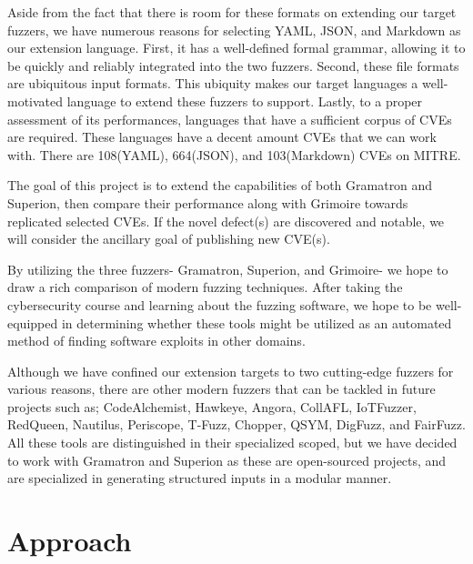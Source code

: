 \documentclass[12pt]{diazessay}
\begin{document}
Aside from the fact that there is room for these formats on extending our target fuzzers, we have numerous reasons for selecting YAML, JSON, and Markdown as our extension language.
First, it has a well-defined formal grammar, allowing it to be quickly and reliably integrated into the two fuzzers.
Second, these file formats are ubiquitous input formats.
This ubiquity makes our target languages a well-motivated language to extend these fuzzers to support.
Lastly, to a proper assessment of its performances, languages that have a sufficient corpus of CVEs are required. 
These languages have a decent amount CVEs that we can work with.
There are 108(YAML), 664(JSON), and 103(Markdown) CVEs on MITRE\cite{MITRE}.

The goal of this project is to extend the capabilities of both Gramatron and Superion, then compare their performance along with Grimoire towards replicated selected CVEs.
If the novel defect(s) are discovered and notable, we will consider the ancillary goal of publishing new CVE(s).

By utilizing the three fuzzers- Gramatron, Superion, and Grimoire- we hope to draw a rich comparison of modern fuzzing techniques.
After taking the cybersecurity course and learning about the fuzzing software, we hope to be well-equipped in determining whether these tools might be utilized as an automated method of finding software exploits in other domains.

Although we have confined our extension targets to two cutting-edge fuzzers for various reasons, 
there are other modern fuzzers that can be tackled in future projects such as; CodeAlchemist\cite{CodeAlchemist1}\cite{CodeAlchemist2}, Hawkeye\cite{Hawkeye}, Angora\cite{Angora1}\cite{Angora2}, CollAFL\cite{CollAFL}, IoTFuzzer\cite{IoTFuzzer}, RedQueen\cite{redqueen}, Nautilus\cite{Nautilus1}\cite{Nautilus2}, Periscope\cite{PeriScope1}\cite{PeriScope2}, T-Fuzz\cite{TFuzz1}\cite{TFuzz2}, Chopper\cite{Chopper}, QSYM\cite{QSYM1}\cite{QSYM2}, DigFuzz\cite{DigFuzz}, and FairFuzz\cite{FairFuzz1}\cite{FairFuzz2}.
All these tools are distinguished in their specialized scoped, but we have decided to work with Gramatron and Superion as these are open-sourced projects, and are specialized in generating structured inputs in a modular manner.




\section*{Approach}
\end{document}
